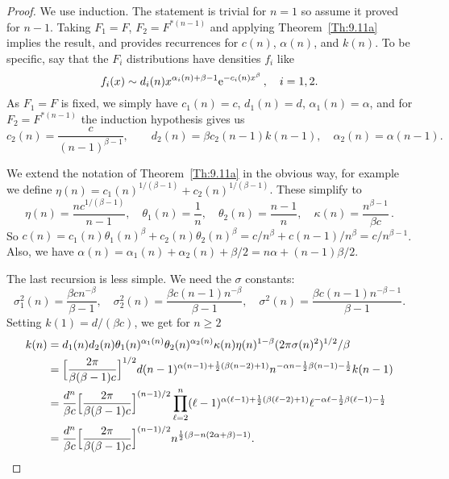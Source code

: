 \begin{proof}
We use induction. The statement is trivial for $n=1$ so assume it proved for $n-1$. 
Taking $F_1=F$, $F_2=F^{*(n-1)}$ and applying Theorem~\ref{Th:9.11a} implies the result, and provides
recurrences for $c(n)$, $\alpha(n)$, and $k(n)$. To be specific, say that the $F_i$  distributions have densities $f_i$ like
\[ f_i(x) \sim d_i(n) x^{\alpha_i(n)+\beta-1} \mathrm{e}^{-c_i(n) x^\beta} \,, \quad i=1,2. \]
As $F_1=F$ is fixed, we simply have $c_1(n) = c$, $d_1(n) = d$, $\alpha_1(n) = \alpha$, and for $F_2=F^{*(n-1)}$ the induction hypothesis gives us
\[ c_2(n) = \frac{c}{(n-1)^{\beta-1}}, \quad
 \quad d_2(n) = \beta c_2(n-1) k(n-1), \quad \alpha_2(n) = \alpha(n-1) . \]

We extend the notation of Theorem~\ref{Th:9.11a} in the obvious way, for example we define $\eta(n)= c_1(n)^{1/(\beta-1)} + c_2(n)^{1/(\beta-1)}$. These simplify to
\[ \eta(n) = \frac{n c^{1/(\beta-1)}}{n-1}, \quad \theta_1(n) = \frac{1}{n}, \quad \theta_2(n) = \frac{n-1}{n}, \quad \kappa(n) = \frac{n^{\beta-1}}{\beta c} \,. \]
So $c(n) = c_1(n) \theta_1(n)^\beta + c_2(n) \theta_2(n)^\beta = c/n^\beta + c (n-1)/n^\beta = c/n^{\beta-1}$. Also, we have
$\alpha(n) = \alpha_1(n) + \alpha_2(n) + \beta/2  = n \alpha + (n-1) \beta / 2$. 

The last recursion is less simple. We need the $\sigma$ constants:
\[ \sigma_1^2(n) = \frac{\beta c n^{-\beta}}{\beta-1}, \quad \sigma_2^2(n) = \frac{\beta c (n-1) n^{-\beta}}{\beta-1} ,\quad \sigma^2(n) = \frac{\beta c (n-1) n^{-\beta-1}}{\beta-1} . \]
Setting $k(1) = d/(\beta c)$, we get for $n\ge 2$
\begin{align*}
k(n) &= d_1(n) d_2(n) \theta_1(n)^{\alpha_1(n)} \theta_2(n)^{\alpha_2(n)} \kappa(n) \eta(n)^{1-\beta} (2\pi \sigma(n)^2)^{1/2} / \beta \\
&= \Big[ \frac{2\pi}{\beta(\beta-1) c} \Big]^{1/2} d (n-1)^{\alpha  (n-1)+\frac{1}{2} (\beta  (n-2)+1)} n^{-\alpha n-\frac{1}{2} \beta  (n-1) -\frac{1}{2}} k(n-1) \\
&= \frac{d^n}{\beta c} \Big[ \frac{2\pi}{\beta(\beta-1) c} \Big]^{(n-1)/2} \prod_{\ell=2}^{n} (\ell-1)^{\alpha  (\ell-1)+\frac{1}{2} (\beta  (\ell-2)+1)} \ell^{-\alpha \ell-\frac{1}{2} \beta  (\ell-1) -\frac{1}{2}} \\
&= \frac{d^n}{\beta c} \Big[ \frac{2\pi}{\beta(\beta-1) c} \Big]^{(n-1)/2} n^{\frac{1}{2} (\beta -n (2 \alpha +\beta )-1)}.
\end{align*}

\end{proof}

